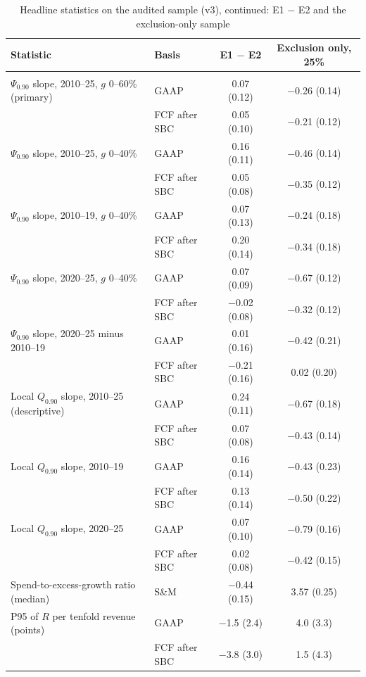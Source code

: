 \begin{table}[t]\centering\footnotesize
\caption{Headline statistics on the audited sample (v3), continued: E1 $-$ E2 and the exclusion-only sample}\label{tab:estimands_v3_more}
\begin{tabular}{@{}>{\raggedright\arraybackslash}p{7.2cm}lcc@{}}\toprule
Statistic & Basis & E1 $-$ E2 & Exclusion only, 25\%\\\midrule
\multicolumn{4}{l}{\emph{A. Model-facing statistics: E1 baseline; E2 and the imputation bounds (D-3)}}\\
$\Psi_{0.90}$ slope, 2010--25, $g$ 0--60\% (primary) & GAAP & 0.07 (0.12) & $-$0.26 (0.14) \\
 & FCF after SBC & 0.05 (0.10) & $-$0.21 (0.12) \\
$\Psi_{0.90}$ slope, 2010--25, $g$ 0--40\% & GAAP & 0.16 (0.11) & $-$0.46 (0.14) \\
 & FCF after SBC & 0.05 (0.08) & $-$0.35 (0.12) \\
$\Psi_{0.90}$ slope, 2010--19, $g$ 0--40\% & GAAP & 0.07 (0.13) & $-$0.24 (0.18) \\
 & FCF after SBC & 0.20 (0.14) & $-$0.34 (0.18) \\
$\Psi_{0.90}$ slope, 2020--25, $g$ 0--40\% & GAAP & 0.07 (0.09) & $-$0.67 (0.12) \\
 & FCF after SBC & $-$0.02 (0.08) & $-$0.32 (0.12) \\
$\Psi_{0.90}$ slope, 2020--25 minus 2010--19 & GAAP & 0.01 (0.16) & $-$0.42 (0.21) \\
 & FCF after SBC & $-$0.21 (0.16) & 0.02 (0.20) \\
Local $Q_{0.90}$ slope, 2010--25 (descriptive) & GAAP & 0.24 (0.11) & $-$0.67 (0.18) \\
 & FCF after SBC & 0.07 (0.08) & $-$0.43 (0.14) \\
Local $Q_{0.90}$ slope, 2010--19 & GAAP & 0.16 (0.14) & $-$0.43 (0.23) \\
 & FCF after SBC & 0.13 (0.14) & $-$0.50 (0.22) \\
Local $Q_{0.90}$ slope, 2020--25 & GAAP & 0.07 (0.10) & $-$0.79 (0.16) \\
 & FCF after SBC & 0.02 (0.08) & $-$0.42 (0.15) \\
Spend-to-excess-growth ratio (median) & S\&M & $-$0.44 (0.15) & 3.57 (0.25) \\
P95 of $R$ per tenfold revenue (points) & GAAP & $-$1.5 (2.4) & 4.0 (3.3) \\
 & FCF after SBC & $-$3.8 (3.0) & 1.5 (4.3) \\

\end{tabular}
\end{table}
